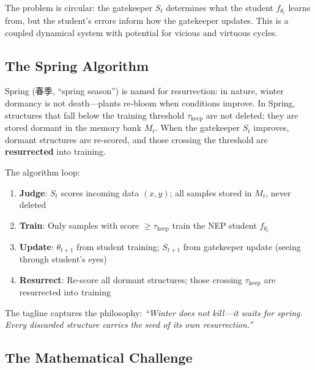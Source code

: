 \documentclass[12pt,a4paper]{ctexart}
\begin{document}
The problem is circular: the gatekeeper $S_t$ determines what the student $f_{\theta_t}$ learns from, but the student's errors inform how the gatekeeper updates. This is a coupled dynamical system with potential for vicious and virtuous cycles.

\subsection{The Spring Algorithm}

Spring (春季, ``spring season'') is named for resurrection: in nature, winter dormancy is not death—plants re-bloom when conditions improve. In Spring, structures that fall below the training threshold $\tau_{\text{keep}}$ are not deleted; they are stored dormant in the memory bank $M_t$. When the gatekeeper $S_t$ improves, dormant structures are re-scored, and those crossing the threshold are \textbf{resurrected} into training.

The algorithm loop:
\begin{enumerate}
\item \textbf{Judge}: $S_t$ scores incoming data $(x, y)$; all samples stored in $M_t$, never deleted
\item \textbf{Train}: Only samples with score $\geq \tau_{\text{keep}}$ train the NEP student $f_{\theta_t}$
\item \textbf{Update}: $\theta_{t+1}$ from student training; $S_{t+1}$ from gatekeeper update (seeing through student's eyes)
\item \textbf{Resurrect}: Re-score all dormant structures; those crossing $\tau_{\text{keep}}$ are resurrected into training
\end{enumerate}

The tagline captures the philosophy: \textit{``Winter does not kill—it waits for spring. Every discarded structure carries the seed of its own resurrection.''}

\subsection{The Mathematical Challenge}
\end{document}
